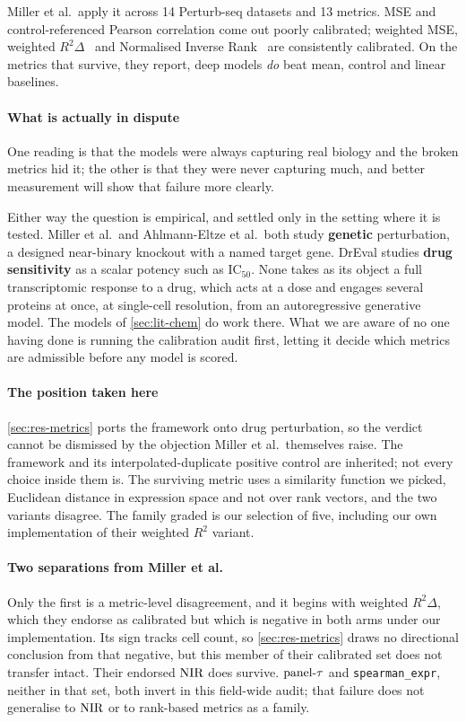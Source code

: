 Miller et al.\ apply it across 14 Perturb-seq datasets and 13 metrics. MSE and
control-referenced Pearson correlation come out poorly calibrated; weighted MSE,
weighted $R^2\Delta$~\cite{mejia} and Normalised Inverse
Rank~\cite{perturbench} are consistently calibrated. On the metrics that survive,
they report, deep models \emph{do} beat mean, control and linear baselines.

\paragraph{What is actually in dispute} One reading is that the models were
always capturing real biology and the broken metrics hid it; the other is that
they were never capturing much, and better measurement will show that failure
more clearly.

Either way the question is empirical, and settled only in the setting where it is
tested. Miller et al.\ and Ahlmann-Eltze et al.\ both study \textbf{genetic}
perturbation, a designed near-binary knockout with a named target gene. DrEval
studies \textbf{drug sensitivity} as a scalar potency such as IC$_{50}$. None
takes as its object a full transcriptomic response to a drug, which acts at a
dose and engages several proteins at once, at single-cell resolution, from an
autoregressive generative model. The models of \cref{sec:lit-chem} do work
there. What we are aware of no one having done is running the calibration audit
first, letting it decide which metrics are admissible before any model is
scored.

\paragraph{The position taken here}
\cref{sec:res-metrics} ports the \DRF{} framework onto drug perturbation, so the
verdict cannot be dismissed by the objection Miller et al.\ themselves raise. The
framework and its interpolated-duplicate positive control are inherited; not
every choice inside them is. The surviving metric uses a similarity function we
picked, Euclidean distance in expression space and not over rank vectors, and the
two variants disagree. The family graded is our selection of five, including our
own implementation of their weighted $R^2$ variant.

\paragraph{Two separations from Miller et al.} Only the first is a metric-level
disagreement, and it begins with weighted $R^2\Delta$, which
they endorse as calibrated but which is negative in both arms under our
implementation. Its sign tracks cell count, so \cref{sec:res-metrics} draws no
directional conclusion from that negative, but this member of their calibrated
set does not transfer intact. Their endorsed $\textrm{NIR}$ does survive. $\textrm{panel-}\tau$ and
\texttt{spearman\_expr}, neither in that set, both invert in this field-wide
audit; that failure does not generalise to $\textrm{NIR}$ or to rank-based metrics as a
family.


